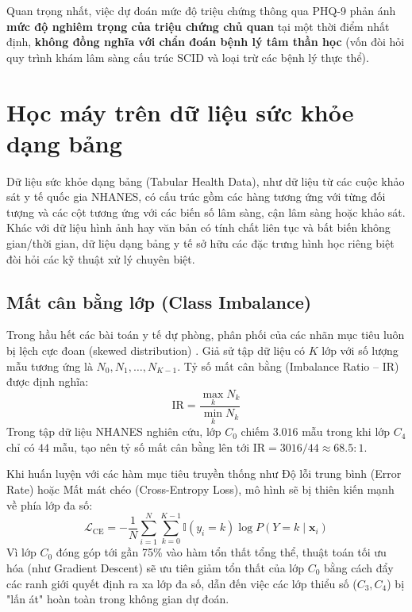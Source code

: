Quan trọng nhất, việc dự đoán mức độ triệu chứng thông qua PHQ-9 phản ánh \textbf{mức độ nghiêm trọng của triệu chứng chủ quan} tại một thời điểm nhất định, \textbf{không đồng nghĩa với chẩn đoán bệnh lý tâm thần học} (vốn đòi hỏi quy trình khám lâm sàng cấu trúc SCID và loại trừ các bệnh lý thực thể).

\section{Học máy trên dữ liệu sức khỏe dạng bảng}
\label{sec:ml-tabular-health}

Dữ liệu sức khỏe dạng bảng (Tabular Health Data), như dữ liệu từ các cuộc khảo sát y tế quốc gia NHANES, có cấu trúc gồm các hàng tương ứng với từng đối tượng và các cột tương ứng với các biến số lâm sàng, cận lâm sàng hoặc khảo sát. Khác với dữ liệu hình ảnh hay văn bản có tính chất liên tục và bất biến không gian/thời gian, dữ liệu dạng bảng y tế sở hữu các đặc trưng hình học riêng biệt đòi hỏi các kỹ thuật xử lý chuyên biệt.

\subsection{Mất cân bằng lớp (Class Imbalance)}
Trong hầu hết các bài toán y tế dự phòng, phân phối của các nhãn mục tiêu luôn bị lệch cực đoan (skewed distribution) \cite{he2009learning}. Giả sử tập dữ liệu có $K$ lớp với số lượng mẫu tương ứng là $N_0, N_1, \dots, N_{K-1}$. Tỷ số mất cân bằng (Imbalance Ratio -- IR) được định nghĩa:
\begin{equation}
    \text{IR} = \frac{\max_k N_k}{\min_k N_k}
\end{equation}
Trong tập dữ liệu NHANES nghiên cứu, lớp $C_0$ chiếm $3.016$ mẫu trong khi lớp $C_4$ chỉ có $44$ mẫu, tạo nên tỷ số mất cân bằng lên tới $\text{IR} = 3016 / 44 \approx 68.5:1$.

Khi huấn luyện với các hàm mục tiêu truyền thống như Độ lỗi trung bình (Error Rate) hoặc Mất mát chéo (Cross-Entropy Loss), mô hình sẽ bị thiên kiến mạnh về phía lớp đa số:
\begin{equation}
    \mathcal{L}_{\text{CE}} = - \frac{1}{N} \sum_{i=1}^N \sum_{k=0}^{K-1} \mathbb{I}(y_i = k) \log P(Y = k \mid \mathbf{x}_i)
\end{equation}
Vì lớp $C_0$ đóng góp tới gần 75\% vào hàm tổn thất tổng thể, thuật toán tối ưu hóa (như Gradient Descent) sẽ ưu tiên giảm tổn thất của lớp $C_0$ bằng cách đẩy các ranh giới quyết định ra xa lớp đa số, dẫn đến việc các lớp thiểu số ($C_3, C_4$) bị "lấn át" hoàn toàn trong không gian dự đoán.

